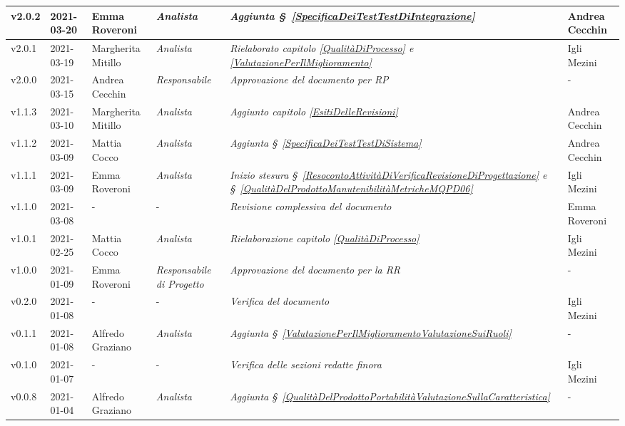 {\begin{center}
\begin{longtable}[c]{|p{2cm-1\tabcolsep}|p{2cm}|p{}|p{}|p{}|p{4cm-2\tabcolsep}|}
		\hline
		\centering v2.0.2 & 2021-03-20 & Emma Roveroni & \centering \textit{Analista}  &  \textit{Aggiunta \S~\ref{SpecificaDeiTestTestDiIntegrazione}} & Andrea Cecchin \\
		\hline
		\centering v2.0.1 & 2021-03-19 & Margherita Mitillo  & \centering \textit{Analista}   &  \textit{Rielaborato capitolo \ref{QualitàDiProcesso} e \ref{ValutazionePerIlMiglioramento}} & Igli Mezini \\
		\hline
		\centering v2.0.0 & 2021-03-15 & Andrea Cecchin & \centering\textit{Responsabile}  &  \textit{Approvazione del documento per RP} & - \\
		\hline
		\centering v1.1.3 & 2021-03-10 & Margherita Mitillo  & \centering \textit{Analista}   &  \textit{Aggiunto capitolo \ref{EsitiDelleRevisioni} } & Andrea Cecchin\\
		\hline
		\centering v1.1.2 & 2021-03-09 & Mattia Cocco & \centering \textit{Analista}  &  \textit{Aggiunta \S~\ref{SpecificaDeiTestTestDiSistema} } & Andrea Cecchin \\
		\hline
		\centering v1.1.1 & 2021-03-09 & Emma Roveroni & \centering \textit{Analista} &  \textit{Inizio stesura \S~\ref{ResocontoAttivitàDiVerificaRevisioneDiProgettazione} e \S~\ref{QualitàDelProdottoManutenibilitàMetricheMQPD06}} & Igli Mezini  \\
		\hline
		\centering v1.1.0 & 2021-03-08 & \centering - & \centering - &  \textit{Revisione complessiva del documento} & Emma Roveroni  \\
		\hline
		\centering v1.0.1 & 2021-02-25 & Mattia Cocco  & \centering \textit{Analista}  &  \textit{Rielaborazione capitolo \ref{QualitàDiProcesso}}  & Igli Mezini \\
		\hline
		\centering v1.0.0  &  2021-01-09 & Emma Roveroni & \centering \textit{Responsabile di Progetto}  & \textit{Approvazione del documento per la RR} & -\\
		\hline
		\centering v0.2.0 & 2021-01-08 & \centering - & \centering - & \textit{Verifica del documento} & Igli Mezini  \\
		\hline
		\centering v0.1.1 & 2021-01-08 & Alfredo Graziano & \centering \textit{Analista}  & \textit{Aggiunta \S~\ref{ValutazionePerIlMiglioramentoValutazioneSuiRuoli}} & - \\
		\hline
		\centering v0.1.0 & 2021-01-07 & \centering - & \centering -  & \textit{Verifica delle sezioni redatte finora} & Igli Mezini \\
		\hline
		\centering v0.0.8 & 2021-01-04 & Alfredo Graziano  & \centering \textit{Analista}  & \textit{Aggiunta  \S~\ref{QualitàDelProdottoPortabilitàValutazioneSullaCaratteristica}}  &  - \\

\end{longtable}
\end{center}}
